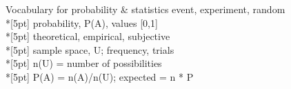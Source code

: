 \documentclass{beamer}
\begin{document}
\begin{frame}{Vocabulary for probability \& statistics}
    event, experiment, random\\*[5pt]
    probability, P(A), values [0,1]\\*[5pt]
    theoretical, empirical, subjective\\*[5pt]
    sample space, U; frequency, trials\\*[5pt]
    n(U) = number of possibilities\\*[5pt]
    P(A) = n(A)/n(U); expected = n * P
\end{frame}
\end{document}
